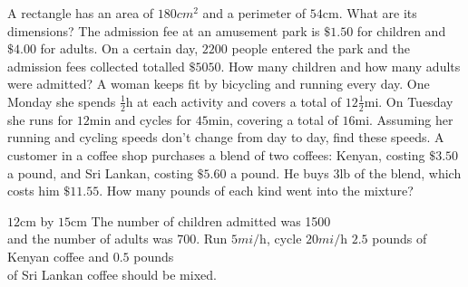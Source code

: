 \begin{Exercise}[title={Word Problems},label=ex15]
	\Question A rectangle has an area of $180 cm^{2}$ and a perimeter of $54 \mbox{cm}$. What are its dimensions? 
	\Question The admission fee at an amusement park is $ \$1.50$ for children and $ \$4.00$ for adults. On a certain day, $2200$ people entered the park and the admission fees collected totalled $ \$5050$. How many children and how many adults were admitted? 
	\Question A woman keeps fit by bicycling and running every day. One Monday she spends $\frac{1}{2} \mbox{h}$ at each activity and covers a total of $12\frac{1}{2} \mbox{mi}$. On Tuesday she runs for $12 \mbox{min}$ and cycles for $45 \mbox{min}$, covering a total of $16 \mbox{mi}$. Assuming her running and cycling speeds don't
	change from day to day, find these speeds.
	\Question A customer
	in a coffee shop purchases a blend of two coffees: Kenyan, costing $ \$3.50$ a pound, and Sri Lankan, costing $ \$5.60$ a pound. He buys $3 \mbox{lb}$ of the blend, which costs him $ \$11.55$. How many pounds of each kind went into the mixture?
\end{Exercise}%
\begin{Answer}[ref={ex15}]		
	\Question $12 \mbox{cm}$ by $15 \mbox{cm}$
	\Question The number of children admitted was 1500\\ and the number
	of adults was 700.
	\Question Run $5 mi/\mbox{h}$, cycle $20 mi/\mbox{h}$ 
	\Question $2.5$ pounds of Kenyan coffee and $0.5$ pounds\\ of Sri Lankan coffee should be mixed. 
\end{Answer}%



